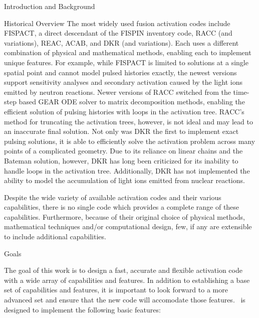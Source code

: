 \begin{chapter}{Introduction and Background}
\begin{section}{Historical Overview}
    The most widely used fusion activation codes include
    FISPACT\cite{FISPACT}, a direct descendant of the FISPIN inventory
    code, RACC\cite{RACC} (and variations\cite{RACCP,RACCUW}),
    REAC\cite{REAC}, ACAB\cite{ACAB}, and DKR\cite{DKR} (and
    variations\cite{adjoint,DKRICF,DKRP}).  Each uses a different
    combination of physical and mathematical methods, enabling each to
    implement unique features.  For example, while FISPACT is limited
    to solutions at a single spatial point and cannot model pulsed
    histories exactly, the newest versions support sensitivity
    analyses and secondary activation caused by the light ions emitted
    by neutron reactions.  Newer versions of RACC switched from the
    time-step based GEAR ODE solver to matrix decomposition methods,
    enabling the efficient solution of pulsing histories with loops in
    the activation tree.  RACC's method for truncating the activation
    trees, however, is not ideal and may lead to an inaccurate final
    solution.  Not only was DKR the first to implement exact pulsing
    solutions, it is able to efficiently solve the activation problem
    across many points of a complicated geometry.  Due to its reliance
    on linear chains and the Bateman solution, however, DKR has long
    been criticized for its inability to handle loops in the
    activation tree.  Additionally, DKR has not implemented the
    ability to model the accumulation of light ions emitted from
    nuclear reactions.
  
    Despite the wide variety of available activation codes and their
    various capabilities, there is no single code which provides a
    complete range of these capabilities.  Furthermore, because of
    their original choice of physical methods, mathematical techniques
    and/or computational design, few, if any are extensible to include
    additional capabilities.
  
  \end{section}
  
  \begin{section}{Goals}
    
    The goal of this work is to design a fast, accurate and flexible
    activation code with a wide array of capabilities and features.
    In addition to establishing a base set of capabilities and
    features, it is important to look forward to a more advanced set
    and ensure that the new code will accomodate those features.
    \ALARA\ is designed to implement the following basic features:


\end{section}
\end{chapter}
